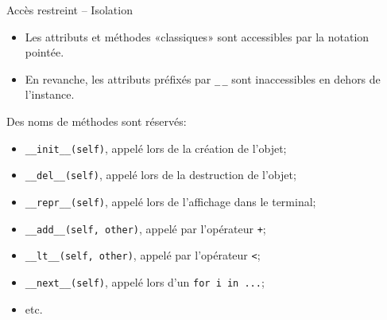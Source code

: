 \documentclass[dvipsnames]{beamer}
\begin{document}
\begin{frame}
    [fragile]{Accès restreint -- Isolation}

    \begin{itemize}
        \item Les attributs et méthodes «classiques» sont accessibles par la
              notation pointée.
        \item En revanche, les attributs préfixés par \verb+_+\,\verb+_+ sont
              inaccessibles en dehors de l'instance.
              \hfill\PointingHand{} \quad\mbox{}
    \end{itemize}

    Des noms de méthodes sont réservés:
    \begin{itemize}
        \scriptsize
        \item \verb+__init__(self)+, appelé lors de la création de l'objet;
        \item \verb+__del__(self)+, appelé lors de la destruction de l'objet;
        \item \verb+__repr__(self)+, appelé lors de l'affichage dans le
              terminal;
        \item \verb+__add__(self, other)+, appelé par l'opérateur \verb|+|;
        \item \verb+__lt__(self, other)+, appelé par l'opérateur \verb|<|;
        \item \verb+__next__(self)+, appelé lors d'un \verb+for i in ...+;
        \item etc.
    \end{itemize}
\end{frame}

\end{document}

